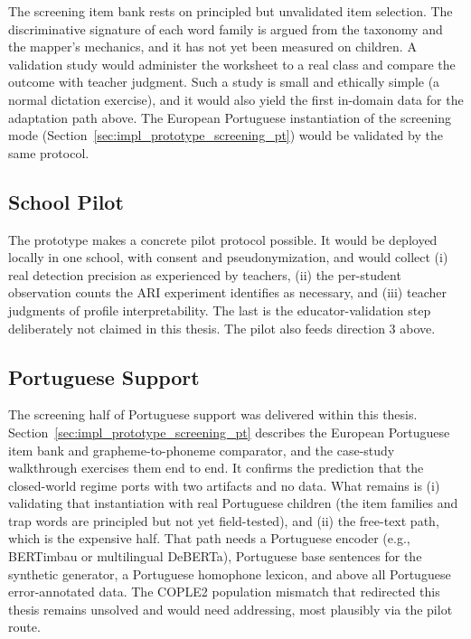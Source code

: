 The screening item bank rests on principled but unvalidated item selection. The discriminative signature of each word family is argued from the taxonomy and the mapper's mechanics, and it has not yet been measured on children. A validation study would administer the worksheet to a real class and compare the outcome with teacher judgment. Such a study is small and ethically simple (a normal dictation exercise), and it would also yield the first in-domain data for the adaptation path above. The European Portuguese instantiation of the screening mode (Section~\ref{sec:impl_prototype_screening_pt}) would be validated by the same protocol.

\subsection{School Pilot}
\label{sec:concl_future_pilot}

The prototype makes a concrete pilot protocol possible. It would be deployed locally in one school, with consent and pseudonymization, and would collect (i) real detection precision as experienced by teachers, (ii) the per-student observation counts the ARI experiment identifies as necessary, and (iii) teacher judgments of profile interpretability. The last is the educator-validation step deliberately not claimed in this thesis. The pilot also feeds direction 3 above.

\subsection{Portuguese Support}
\label{sec:concl_future_pt}

The screening half of Portuguese support was delivered within this thesis. Section~\ref{sec:impl_prototype_screening_pt} describes the European Portuguese item bank and grapheme-to-phoneme comparator, and the case-study walkthrough exercises them end to end. It confirms the prediction that the closed-world regime ports with two artifacts and no data. What remains is (i) validating that instantiation with real Portuguese children (the item families and trap words are principled but not yet field-tested), and (ii) the free-text path, which is the expensive half. That path needs a Portuguese encoder (e.g., BERTimbau or multilingual DeBERTa), Portuguese base sentences for the synthetic generator, a Portuguese homophone lexicon, and above all Portuguese error-annotated data. The COPLE2 population mismatch that redirected this thesis remains unsolved and would need addressing, most plausibly via the pilot route.

